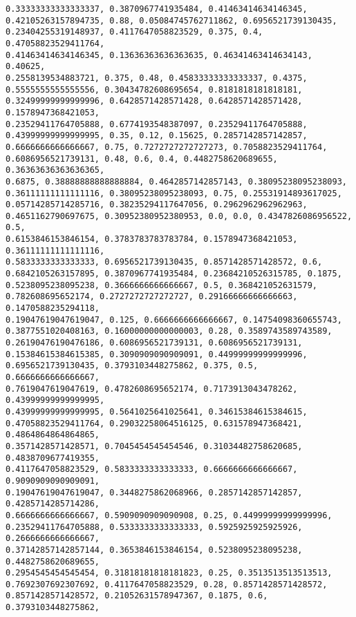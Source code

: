 \documentclass[11pt]{article}
\begin{document}
\begin{Verbatim}[commandchars=\\\{\}]
0.33333333333333337, 0.3870967741935484, 0.41463414634146345,
0.42105263157894735, 0.88, 0.05084745762711862, 0.6956521739130435,
0.23404255319148937, 0.4117647058823529, 0.375, 0.4, 0.47058823529411764,
0.41463414634146345, 0.13636363636363635, 0.46341463414634143, 0.40625,
0.2558139534883721, 0.375, 0.48, 0.45833333333333337, 0.4375,
0.5555555555555556, 0.30434782608695654, 0.8181818181818181,
0.32499999999999996, 0.6428571428571428, 0.6428571428571428, 0.1578947368421053,
0.23529411764705888, 0.6774193548387097, 0.23529411764705888,
0.43999999999999995, 0.35, 0.12, 0.15625, 0.2857142857142857,
0.6666666666666667, 0.75, 0.7272727272727273, 0.7058823529411764,
0.6086956521739131, 0.48, 0.6, 0.4, 0.4482758620689655, 0.36363636363636365,
0.6875, 0.38888888888888884, 0.4642857142857143, 0.38095238095238093,
0.36111111111111116, 0.38095238095238093, 0.75, 0.25531914893617025,
0.05714285714285716, 0.38235294117647056, 0.2962962962962963,
0.4651162790697675, 0.30952380952380953, 0.0, 0.0, 0.4347826086956522, 0.5,
0.6153846153846154, 0.3783783783783784, 0.1578947368421053, 0.36111111111111116,
0.5833333333333333, 0.6956521739130435, 0.8571428571428572, 0.6,
0.6842105263157895, 0.3870967741935484, 0.23684210526315785, 0.1875,
0.5238095238095238, 0.3666666666666667, 0.5, 0.368421052631579,
0.782608695652174, 0.2727272727272727, 0.29166666666666663, 0.1470588235294118,
0.19047619047619047, 0.125, 0.6666666666666667, 0.14754098360655743,
0.3877551020408163, 0.16000000000000003, 0.28, 0.3589743589743589,
0.26190476190476186, 0.6086956521739131, 0.6086956521739131,
0.15384615384615385, 0.3090909090909091, 0.44999999999999996,
0.6956521739130435, 0.3793103448275862, 0.375, 0.5, 0.6666666666666667,
0.7619047619047619, 0.4782608695652174, 0.7173913043478262, 0.43999999999999995,
0.43999999999999995, 0.5641025641025641, 0.34615384615384615,
0.47058823529411764, 0.29032258064516125, 0.631578947368421, 0.4864864864864865,
0.3571428571428571, 0.7045454545454546, 0.31034482758620685, 0.4838709677419355,
0.4117647058823529, 0.5833333333333333, 0.6666666666666667, 0.9090909090909091,
0.19047619047619047, 0.3448275862068966, 0.2857142857142857, 0.4285714285714286,
0.6666666666666667, 0.5909090909090908, 0.25, 0.44999999999999996,
0.23529411764705888, 0.5333333333333333, 0.5925925925925926, 0.2666666666666667,
0.37142857142857144, 0.3653846153846154, 0.5238095238095238, 0.4482758620689655,
0.2954545454545454, 0.31818181818181823, 0.25, 0.3513513513513513,
0.7692307692307692, 0.4117647058823529, 0.28, 0.8571428571428572,
0.8571428571428572, 0.21052631578947367, 0.1875, 0.6, 0.3793103448275862,

\end{Verbatim}
\end{document}
